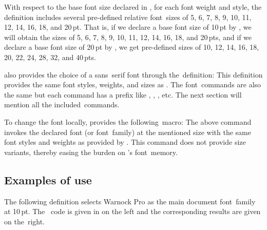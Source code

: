 {{With respect to the base font size declared in , for each font weight and style, the definition  includes several pre-defined relative font~sizes of 5, 6, 7, 8, 9, 10, 11, 12, 14, 16, 18, and 20\,pt. That is, if we declare a base font size of 10\,pt by , we will obtain the sizes of 5, 6, 7, 8, 9, 10, 11, 12, 14, 16, 18, and 20\,pts, and if we declare a base font size of 20\,pt by , we get pre-defined sizes of 10, 12, 14, 16, 18, 20, 22, 24, 28, 32, and 40\,pts.

 also provides the choice of a sans~serif font through the~definition:
\ms
\ii{}
\sk
\ii This definition provides the same font styles, weights, and sizes as . The font~commands are also the same but each command has a prefix  like , , , etc. The next section will mention all the included~commands.

To change the font locally,  provides the following~macro:
\ms
\ii{}
\sk
\ii The above command invokes the declared font (or font~family) at the mentioned size with the same font styles and weights as provided by . This command does not provide size variants, thereby easing the burden on \capstex's font~memory.






\subsection{Examples of use}The following definition selects Warnock Pro as the main document font~family at 10\,pt. The \capstex\ code is given in  on the left and the corresponding results are given on the~right.

\ms
{}}}
